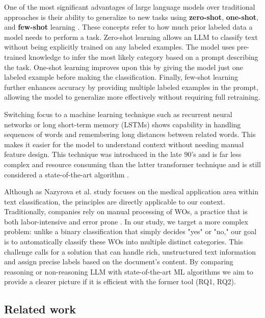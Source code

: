 One of the most significant advantages of large language models over traditional approaches is their ability to generalize to new tasks using \textbf{zero-shot}, \textbf{one-shot}, and \textbf{few-shot} learning \cite{brown2020language}. These concepts refer to how much prior labeled data a model needs to perform a task. Zero-shot learning allows an LLM to classify text without being explicitly trained on any labeled examples. The model uses pre-trained knowledge to infer the most likely category based on a prompt describing the task. One-shot learning improves upon this by giving the model just one labeled example before making the classification. Finally, few-shot learning further enhances accuracy by providing multiple labeled examples in the prompt, allowing the model to generalize more effectively without requiring full retraining.

Switching focus to a machine learning technique such as recurrent neural networks or long short-term memory (LSTMs) shows capability in handling sequences of words and remembering long distances between related words. This makes it easier for the model to understand context without needing manual feature design. This technique was introduced in the late 90's and is far less complex and resource consuming than the latter transformer technique and is still considered a state-of-the-art algorithm \cite{wang2024classifiers, hochreiter1997long}.

Although as Nazyrova et al. \cite{nazyrova2024medical} study focuses on the medical application area within text classification, the principles are directly applicable to our context.  Traditionally, companies rely on manual processing of WOs, a practice that is both labor-intensive and error prone \cite{li2024work}. In our study, we target a more complex problem: unlike a binary classification that simply decides "yes" or "no," our goal is to automatically classify these WOs into multiple distinct categories. This challenge calls for a solution that can handle rich, unstructured text information and assign precise labels based on the document’s content. By comparing reasoning or non-reasoning LLM with state-of-the-art ML algorithms we aim to provide a clearer picture if it is efficient with the former tool (RQ1, RQ2).

\subsection{Related work}


